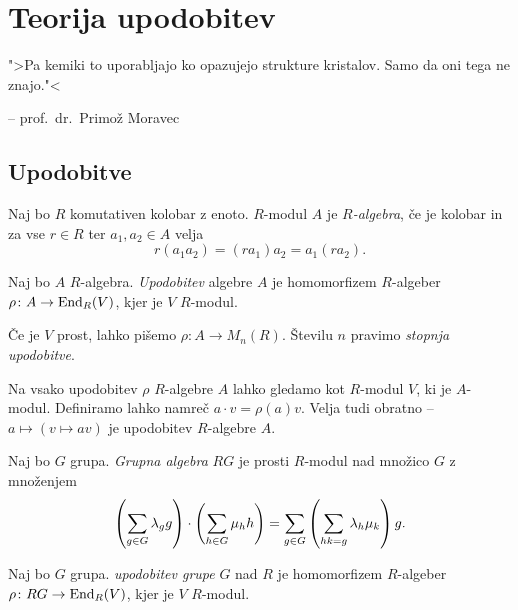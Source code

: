 \section{Teorija upodobitev}

\epigraph{">Pa kemiki to uporabljajo ko opazujejo strukture
kristalov. Samo da oni tega ne znajo."<}{-- prof.~dr.~Primož
Moravec}

\subsection{Upodobitve}

\begin{definicija}
Naj bo $R$ komutativen kolobar z enoto. $R$-modul $A$ je
\emph{$R$-algebra}, če je kolobar in za vse
$r \in R$ ter $a_1, a_2 \in A$ velja
\[
r(a_1 a_2) = (r a_1) a_2 = a_1 (r a_2).
\]
\end{definicija}

\begin{definicija}
Naj bo $A$ $R$-algebra.
\emph{Upodobitev} algebre $A$ je
homomorfizem $R$-algeber $\rho \colon A \to \operatorname{End}_R(V)$, kjer je $V$
$R$-modul.
\end{definicija}

\begin{opomba}
Če je $V$ prost, lahko pišemo $\rho \colon A \to M_n(R)$. Številu
$n$ pravimo \emph{stopnja upodobitve}.
\end{opomba}

\begin{opomba}
Na vsako upodobitev $\rho$ $R$-algebre $A$ lahko gledamo kot
$R$-modul $V$, ki je $A$-modul. Definiramo lahko namreč
$a \cdot v = \rho(a)v$. Velja tudi obratno --
$a \mapsto (v \mapsto av)$ je upodobitev $R$-algebre $A$.
\end{opomba}

\begin{definicija}
Naj bo $G$ grupa. \emph{Grupna algebra} $RG$
je prosti $R$-modul nad množico $G$ z množenjem
\[
\left(\sum_{g \in G} \lambda_g g\right) \cdot \left(\sum_{h \in G} \mu_h h\right) =
\sum_{g \in G} \left(\sum_{hk = g} \lambda_h \mu_k\right) g.
\]
\end{definicija}

\begin{definicija}
Naj bo $G$ grupa. \emph{upodobitev grupe}
$G$ nad $R$ je homomorfizem $R$-algeber
$\rho \colon RG \to \operatorname{End}_R(V)$, kjer je $V$ $R$-modul.
\end{definicija}

